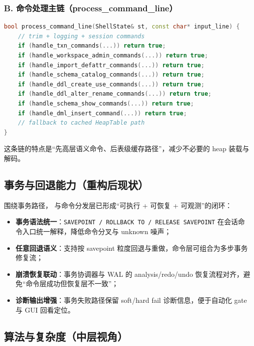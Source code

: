 \subsubsection{B. 命令处理主链（process\_command\_line）}
\begin{lstlisting}[language=C++,caption={命令分发主链（节选）}]
bool process_command_line(ShellState& st, const char* input_line) {
    // trim + logging + session commands
    if (handle_txn_commands(...)) return true;
    if (handle_workspace_admin_commands(...)) return true;
    if (handle_import_defattr_commands(...)) return true;
    if (handle_schema_catalog_commands(...)) return true;
    if (handle_ddl_create_use_commands(...)) return true;
    if (handle_ddl_alter_rename_commands(...)) return true;
    if (handle_schema_show_commands(...)) return true;
    if (handle_dml_insert_command(...)) return true;
    // fallback to cached HeapTable path
}
\end{lstlisting}

这条链的特点是“先高层语义命令、后表级缓存路径”，减少不必要的 heap 装载与解码。

\subsection{事务与回退能力（重构后现状）}

围绕事务路径， 与命令分发层已形成“可执行 + 可恢复 + 可观测”的闭环：

\begin{itemize}
  \item \textbf{事务语法统一}：\texttt{SAVEPOINT / ROLLBACK TO / RELEASE SAVEPOINT} 在会话命令入口统一解释，降低命令分叉与 unknown 噪声；
  \item \textbf{任意回退语义}：支持按 savepoint 粒度回退与重做，命令层可组合为多步事务修复流；
  \item \textbf{崩溃恢复联动}：事务协调器与 WAL 的 analysis/redo/undo 恢复流程对齐，避免“命令层成功但恢复层不一致”；
  \item \textbf{诊断输出增强}：事务失败路径保留 soft/hard fail 诊断信息，便于自动化 gate 与 GUI 回看定位。
\end{itemize}

\subsection{算法与复杂度（中层视角）}

